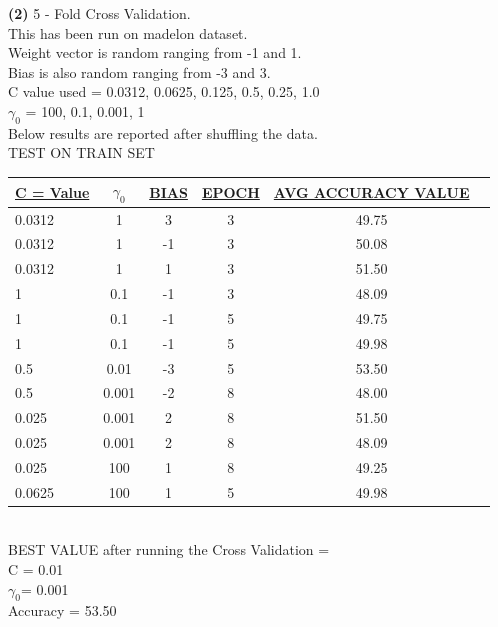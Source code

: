 \documentclass[11pt]{article}
\renewcommand\part[1]{\vspace{.10in}\textbf{(#1)}}
\begin{document}
\part{2} 5 - Fold Cross Validation.\\
This has been run on madelon dataset.\\
Weight vector is random ranging from -1 and 1.\\
Bias is also random ranging from -3 and 3.\\
C value used = 0.0312, 0.0625, 0.125, 0.5, 0.25, 1.0\\
$\gamma_{0}$ = 100, 0.1, 0.001, 1\\
Below results are reported after shuffling the data.\\[15pt]
TEST ON TRAIN SET\\
\bgroup 
\def\arraystretch{1.2}
\begin{tabular}{|l|c|c|c|c|c|} \hline 
{\bf \underline {C = Value}} & {\bf \underline {$\gamma_{0}$}} & {\bf \underline {BIAS}} & {\bf \underline {EPOCH}} & {\bf \underline {AVG ACCURACY VALUE}} \\ \hline
0.0312 & 1 & 3 & 3 & 49.75 \\ \hline
0.0312 & 1 & -1 & 3 & 50.08\\ \hline
0.0312 & 1 & 1 & 3 & 51.50\\ \hline
1 & 0.1 & -1 & 3 & 48.09\\ \hline
1 & 0.1 & -1 & 5 & 49.75\\ \hline
1 & 0.1 & -1 & 5 & 49.98\\ \hline
0.5 & 0.01 & -3 & 5 & 53.50 \\ \hline
0.5 & 0.001 & -2 & 8 & 48.00\\ \hline
0.025 & 0.001 & 2 & 8 & 51.50\\ \hline
0.025 & 0.001 & 2 & 8 & 48.09\\ \hline
0.025 & 100 & 1 & 8 & 49.25\\ \hline
0.0625 & 100 & 1 & 5 & 49.98\\ \hline

\end{tabular}
\egroup\\[20pt]


BEST VALUE after running the Cross Validation =\\
C = 0.01\\
$\gamma_{0}$= 0.001\\
Accuracy = 53.50
\end{document}
